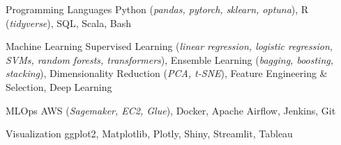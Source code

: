 

\begin{cvskills}

  \cvskill
    {Programming Languages}
    {Python (\small\textit{pandas, pytorch, sklearn, optuna}), R (\small\textit{tidyverse}), SQL, Scala, Bash}

  \cvskill
    {Machine Learning}
    {
      Supervised Learning (\small\textit{linear regression, logistic regression, SVMs, random forests, transformers}), 
      Ensemble Learning (\small\textit{bagging, boosting, stacking}), 
      Dimensionality Reduction (\small\textit{PCA, t-SNE}), 
      Feature Engineering \& Selection, %
      Deep Learning %
    }

  \cvskill
    {MLOps}
    {AWS (\small\textit{Sagemaker, EC2, Glue}), Docker, Apache Airflow, Jenkins, Git}

  \cvskill
    {Visualization}
    {ggplot2, Matplotlib, Plotly, Shiny, Streamlit, Tableau}

  

\end{cvskills}
